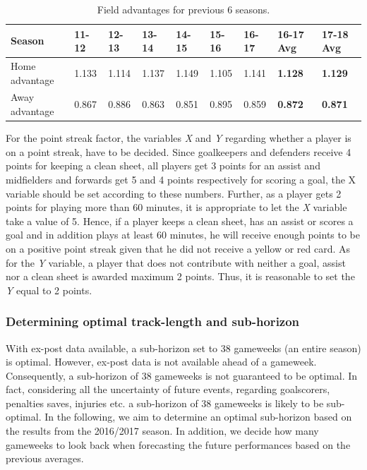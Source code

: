 \begin{table}[H]
\centering
\smaller
\begin{tabular}{|l|l|l|l|l|l|l|l|l|}
\hline
Season & 11-12    & 12-13   & 13-14    & 14-15    & 15-16 & 16-17 & 16-17 Avg & 17-18 Avg \\ 
\hline
Home advantage & 1.133 & 1.114 & 1.137 & 1.149 & 1.105 & 1.141 & \textbf{1.128} & \textbf{1.129}\\
\hline
Away advantage & 0.867 & 0.886 & 0.863 & 0.851 & 0.895 & 0.859 & \textbf{0.872} & \textbf{0.871}\\
\hline
\end{tabular}
\caption{Field advantages for previous 6 seasons.}
\label{Field advantage}
\end{table}

For the point streak factor, the variables \textit{X} and \textit{Y} regarding whether a player is on a point streak, have to be decided. Since goalkeepers and defenders receive 4 points for keeping a clean sheet, all players get 3 points for an assist and midfielders and forwards get 5 and 4 points respectively for scoring a goal, the X variable should be set according to these numbers. Further, as a player gets 2 points for playing more than 60 minutes, it is appropriate to let the \textit{X} variable take a value of 5. Hence, if a player keeps a clean sheet, has an assist or scores a goal and in addition plays at least 60 minutes, he will receive enough points to be on a positive point streak given that he did not receive a yellow or red card. As for the \textit{Y} variable, a player that does not contribute with neither a goal, assist nor a clean sheet is awarded maximum 2 points. Thus, it is reasonable to set the \textit{Y} equal to 2 points. 


\subsubsection{Determining optimal track-length and sub-horizon}

With ex-post data available, a sub-horizon set to 38 gameweeks (an entire season) is optimal. However, ex-post data is not available ahead of a gameweek. Consequently, a sub-horizon of 38 gameweeks is not guaranteed to be optimal. In fact, considering all the uncertainty of future events, regarding goalscorers, penalties saves, injuries etc. a sub-horizon of 38 gameweeks is likely to be sub-optimal. In the following, we aim to determine an optimal sub-horizon based on the results from the 2016/2017 season. In addition, we decide how many gameweeks to look back when forecasting the future performances based on the previous averages.

